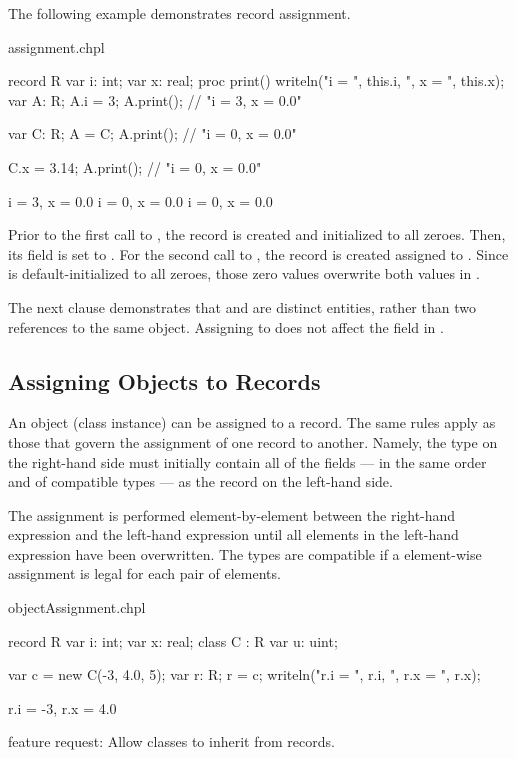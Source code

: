 The following example demonstrates record assignment.
\begin{chapelexample}{assignment.chpl}
\begin{chapel}
record R {
  var i: int;
  var x: real;
  proc print() { writeln("i = ", this.i, ", x = ", this.x); }
}
var A: R;
A.i = 3;
A.print();	// "i = 3, x = 0.0"

var C: R;
A = C;
A.print();	// "i = 0, x = 0.0"

C.x = 3.14;
A.print();	// "i = 0, x = 0.0"
\end{chapel}
\begin{chapeloutput}
i = 3, x = 0.0
i = 0, x = 0.0
i = 0, x = 0.0
\end{chapeloutput}
Prior to the first call to , the record  is created and
initialized to all zeroes.  Then, its  field is set to .
For the second call to , the record  is created assigned
to .  Since  is default-initialized to all zeroes, those zero
values overwrite both values in .

The next clause demonstrates that  and  are distinct entities,
rather than two references to the same object.  Assigning 
to  does not affect the  field in .
\end{chapelexample}

\subsection{Assigning Objects to Records}
\label{Assigning_Objects_to_Records}

An object (class instance) can be assigned to a record.  The same rules apply as
those that govern the assignment of one record to another.  Namely, the type on
the right-hand side must initially contain all of the fields --- in the same
order and of compatible types --- as the record on the left-hand side.

The assignment is performed element-by-element between the right-hand expression
and the left-hand expression until all elements in the left-hand expression have
been overwritten.  The types are compatible if a element-wise assignment is
legal for each pair of elements.

\begin{chapelexample}{objectAssignment.chpl}
\begin{chapel}
record R {
  var i: int;
  var x: real;
}
class C : R {
  var u: uint;
}

var c = new C(-3, 4.0, 5);
var r: R;
r = c;
writeln("r.i = ", r.i, ", r.x = ", r.x);
\end{chapel}
\begin{chapeloutput}
r.i = -3, r.x = 4.0
\end{chapeloutput}
\begin{chapelfuture}
feature request: Allow classes to inherit from records.
\end{chapelfuture}
\end{chapelexample}

